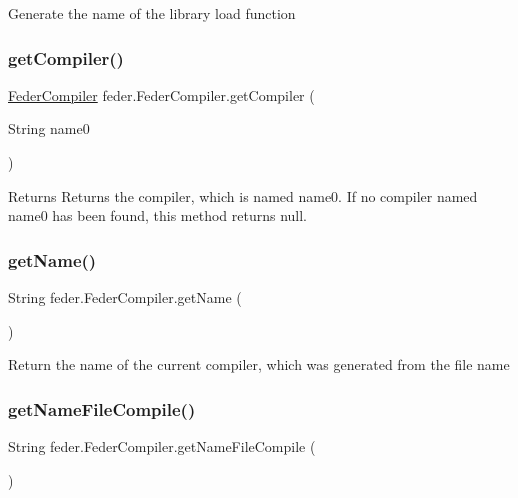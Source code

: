 Generate the name of the library load function \mbox{\label{classfeder_1_1FederCompiler_a84f29a6bcfa849ab97b0aed77e1008c3}} 
\subsubsection{\texorpdfstring{get\+Compiler()}{getCompiler()}}
{\footnotesize\ttfamily \hyperlink{classfeder_1_1FederCompiler}{Feder\+Compiler} feder.\+Feder\+Compiler.\+get\+Compiler (\begin{DoxyParamCaption}\item[{String}]{name0 }\end{DoxyParamCaption})}

\begin{DoxyReturn}{Returns}
Returns the compiler, which is named \textquotesingle{}name0\textquotesingle{}. If no compiler named \textquotesingle{}name0\textquotesingle{} has been found, this method returns \textquotesingle{}null\textquotesingle{}. 
\end{DoxyReturn}
\mbox{\label{classfeder_1_1FederCompiler_a4ae5a5159ac30049c08879dfca2fe308}} 
\subsubsection{\texorpdfstring{get\+Name()}{getName()}}
{\footnotesize\ttfamily String feder.\+Feder\+Compiler.\+get\+Name (\begin{DoxyParamCaption}{ }\end{DoxyParamCaption})}

Return the name of the current compiler, which was generated from the file name \mbox{\label{classfeder_1_1FederCompiler_a0cfbca0eeb6cccdb953d1f4232aba37e}} 
\subsubsection{\texorpdfstring{get\+Name\+File\+Compile()}{getNameFileCompile()}}
{\footnotesize\ttfamily String feder.\+Feder\+Compiler.\+get\+Name\+File\+Compile (\begin{DoxyParamCaption}{ }\end{DoxyParamCaption})}

